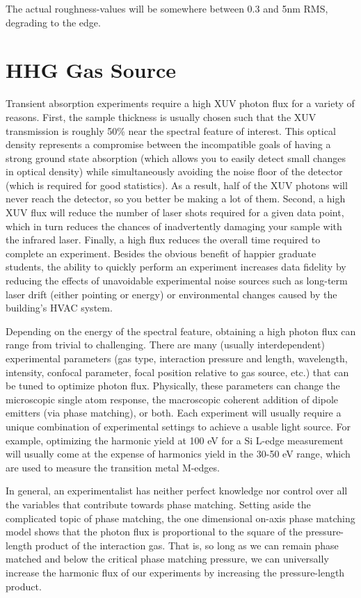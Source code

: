 The actual roughness-values will be somewhere between 0.3 and 5nm RMS, degrading to the edge.



\section{HHG Gas Source}

Transient absorption experiments require a high XUV photon flux for a variety of reasons. First, the sample thickness is usually chosen such that the XUV transmission is roughly 50\% near the spectral feature of interest. This optical density represents a compromise between the incompatible goals of having a strong ground state absorption (which allows you to easily detect small changes in optical density) while simultaneously avoiding the noise floor of the detector (which is required for good statistics). As a result, half of the XUV photons will never reach the detector, so you better be making a lot of them. Second, a high XUV flux will reduce the number of laser shots required for a given data point, which in turn reduces the chances of inadvertently damaging your sample with the infrared laser. Finally, a high flux reduces the overall time required to complete an experiment. Besides the obvious benefit of happier graduate students, the ability to quickly perform an experiment increases data fidelity by reducing the effects of unavoidable experimental noise sources such as long-term laser drift (either pointing or energy) or environmental changes caused by the building's HVAC system.

Depending on the energy of the spectral feature, obtaining a high photon flux can range from trivial to challenging. There are many (usually interdependent) experimental parameters (gas type, interaction pressure and length, wavelength, intensity, confocal parameter, focal position relative to gas source, etc.) that can be tuned to optimize photon flux. Physically, these parameters can change the microscopic single atom response, the macroscopic coherent addition of dipole emitters (via phase matching), or both. Each experiment will usually require a unique combination of experimental settings to achieve a usable light source. For example, optimizing the harmonic yield at 100 eV for a Si L-edge measurement will usually come at the expense of harmonics yield in the 30-50 eV range, which are used to measure the transition metal M-edges.

In general, an experimentalist has neither perfect knowledge nor control over all the variables that contribute towards phase matching. Setting aside the complicated topic of phase matching, the one dimensional on-axis phase matching model\cite{constantOptimizingHighHarmonic1999} shows that the photon flux is proportional to the square of the pressure-length product of the interaction gas. That is, so long as we can remain phase matched and below the critical phase matching pressure\cite{popmintchevPhaseMatchingHigh2009}, we can universally increase the harmonic flux of our experiments by increasing the pressure-length product.

